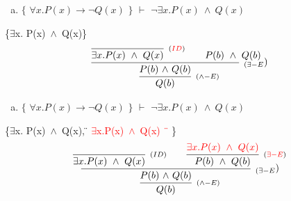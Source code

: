 \documentclass[aspectratio=43]{beamer}
\newcommand{\ex}{$\exists$}
\newcommand{\andd}{$\wedge$}
\begin{document}
    \begin{frame}[fragile]
    	
    	\begin{enumerate}[b)]
			
			\item $\{$ $\forall x.P(x)\to \neg Q(x)$ $\}$ $\vdash$ $ \neg\exists  x.P(x)\ \wedge\ Q(x)$ \\ 
			
		\end{enumerate}
        \{\ex  x. P(x)\ \andd\ Q(x)\}
        \vspace{85pt}
        \[
        \begin{array}{c}
		
        	\infer[_{(\land-E)}]
            {Q(b)}
            {\infer[_{(\exists-E})]
                {P(b)\ $\andd$\ Q(b)}
            	{\infer[_{(\textcolor{red}{ID})}] 
                	{\exists x.P(x)\ \wedge\ Q(x)}
                    {}
               	\hspace{20pt} 
                P(b)\ \wedge\ Q(b)
                }
            }
		\end{array}
        \]
        
	\end{frame}
    
    \begin{frame}[fragile]
    	
    	\begin{enumerate}[b)]
			
			\item $\{$ $\forall x.P(x)\to \neg Q(x)$ $\}$ $\vdash$ $ \neg\exists  x.P(x)\ \wedge\ Q(x)$ \\ 
			
		\end{enumerate}
        \{\ex  x. P(x)\ \andd\ Q(x), \textcolor{red}{\" \ex x.P(x)\ \andd \ Q(x) \"\ } \}
        \vspace{85pt}
        \[
        \begin{array}{c}
		
        	\infer[_{(\land-E)}]
            {Q(b)}
            {\infer[_{(\exists-E})]
                {P(b)\ $\andd$\ Q(b)}
            	{\infer[_{(ID)}] 
                	{\exists x.P(x)\ \wedge\ Q(x)}
                    {}
               	\hspace{20pt} 
                \infer[_{(\textcolor{red}{\exists -E})}] 
                	{P(b)\ \wedge\ Q(b)}
                    {\textcolor{red}{\exists x.P(x)\ \wedge \ Q(x)}}
                }
            }
		\end{array}
        \]
        
	\end{frame}
    
\end{document}
